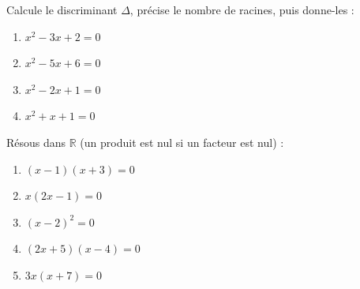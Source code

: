 \documentclass[11pt,a4paper]{article}
\newcommand{\R}{\mathbb{R}}
\begin{document}
\begin{exo}
Calcule le discriminant $\Delta$, précise le nombre de racines, puis donne-les :
\begin{enumerate}[label=\alph*),leftmargin=2em,topsep=1pt,itemsep=1pt]
  \item $x^{2}-3x+2=0$ \qquad
  \item $x^{2}-5x+6=0$ \qquad
  \item $x^{2}-2x+1=0$ \qquad
  \item $x^{2}+x+1=0$
\end{enumerate}
\end{exo}

\begin{exo}
Résous dans $\R$ (un produit est nul si un facteur est nul) :
\begin{enumerate}[label=\alph*),leftmargin=2em,topsep=1pt,itemsep=1pt]
  \item $(x-1)(x+3)=0$ \qquad
  \item $x(2x-1)=0$ \qquad
  \item $(x-2)^{2}=0$ \qquad
  \item $(2x+5)(x-4)=0$ \qquad
  \item $3x(x+7)=0$
\end{enumerate}
\end{exo}
\end{document}

